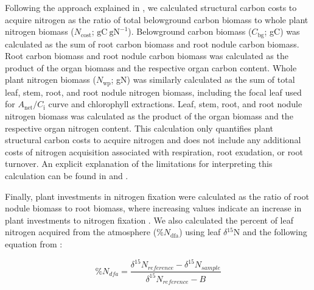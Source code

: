 Following the approach explained in , we calculated structural carbon costs to acquire nitrogen as the ratio of total belowground carbon biomass to whole plant nitrogen biomass ($N_\mathrm{cost}$; $\mathrm{gC\ gN^{-1}}$). Belowground carbon biomass ($C_\mathrm{bg}$; gC) was calculated as the sum of root carbon biomass and root nodule carbon biomass. Root carbon biomass and root nodule carbon biomass was calculated as the product of the organ biomass and the respective organ carbon content. Whole plant nitrogen biomass ($N_\mathrm{wp}$; gN) was similarly calculated as the sum of total leaf, stem, root, and root nodule nitrogen biomass, including the focal leaf used for $A_\mathrm{{net}}/C_\mathrm{i}$ curve and chlorophyll extractions. Leaf, stem, root, and root nodule nitrogen biomass was calculated as the product of the organ biomass and the respective organ nitrogen content. This calculation only quantifies plant structural carbon costs to acquire nitrogen and does not include any additional costs of nitrogen acquisition associated with respiration, root exudation, or root turnover. An explicit explanation of the limitations for interpreting this calculation can be found in  and .

Finally, plant investments in nitrogen fixation were calculated as the ratio of root nodule biomass to root biomass, where increasing values indicate an increase in plant investments to nitrogen fixation . We also calculated the percent of leaf nitrogen acquired from the atmosphere (\%$N_\mathrm{dfa}$) using leaf $\delta\mathrm{^{15}{N}}$ and the following equation from :

\begin{equation} \label{eqn_5.11}
    \%N_{dfa} = \frac{\delta^{15}N{}_{reference} - \delta^{15}N{}_{sample}}{\delta^{15}N{}_{reference} - B}
\end{equation}
    

